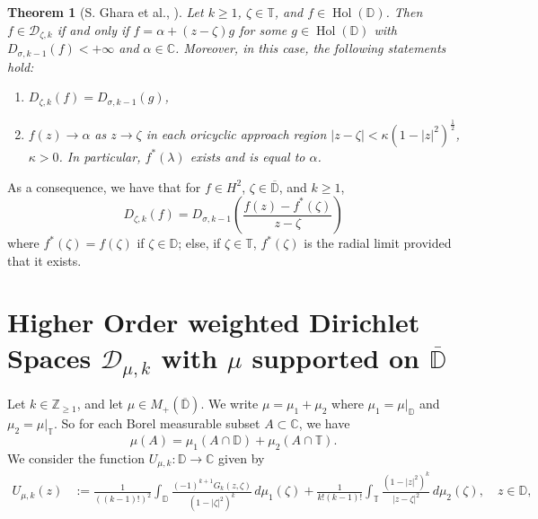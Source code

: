 \documentclass[10pt,oneside,reqno]{amsart}
\newtheorem{theorem}{Theorem}[section]
\theoremstyle{definition}
\theoremstyle{remark}
\newcommand{\abs}[1]{\left\lvert #1 \right\rvert}
\renewcommand{\ge}{\geqslant}
\newcommand{\C}{\mathbb C}
\newcommand{\D}{\mathbb D}
\newcommand{\T}{\mathbb T}
\numberwithin{equation}{section}
\begin{document}
\begin{theorem}[S. Ghara et al., \cite{GGRLDF}]
    Let $k \ge 1$, $\zeta \in \T$, and $f \in \operatorname{Hol} (\D)$. Then $f \in \mathscr D_{\zeta, k}$ if and only if $f = \alpha + (z-\zeta) g$ for some $g \in \operatorname{Hol} (\D)$ with $D_{\sigma, k-1} (f) < + \infty$ and $\alpha \in \C$. Moreover, in this case, the following statements hold:
    \begin{enumerate}[label=(\roman*)]
        \item $D_{\zeta, k} (f) = D_{\sigma, k-1} (g)$,
        \item $f(z) \to \alpha$ as $z \to \zeta$ in each oricyclic approach region $\abs{z-\zeta} < \kappa (1-\abs{z}^2)^{\frac{1}{2}}$, $\kappa > 0$. In particular, $f^{*} (\lambda)$ exists and is equal to $\alpha$.
    \end{enumerate}
\end{theorem}
As a consequence, we have that for $f \in H^2$, $\zeta \in \overline{\D}$, and $k \ge 1$,  
\begin{equation}  
    D_{\zeta, k} (f) = D_{\sigma, k-1} \left( \frac{f(z) - f^{*} (\zeta)}{z-\zeta} \right)
    \label{eqn:local-douglas-formula}
\end{equation}  
where $f^{*} (\zeta) = f(\zeta)$ if $\zeta \in \D$; else, if $\zeta \in \T$, $f^{*} (\zeta)$ is the radial limit provided that it exists.  

\section{Higher Order weighted Dirichlet Spaces \texorpdfstring{$\mathscr D_{\mu,k}$}{D(mu,k)} with \texorpdfstring{$\mu$}{mu} supported on \texorpdfstring{$\overline{\mathbb D}$}{bar D}}

Let $k \in \mathbb Z _{\ge 1}$, and let $\mu\in M_+(\overline{\D}).$ We write $\mu = \mu_1+\mu_2$ where $\mu_1= \mu|_{\D}$ and $\mu_2= \mu|_{\mathbb T}.$ So for each Borel measurable subset $A \subset \C$, we have 
\begin{equation*}
    \mu (A) = \mu_1 (A \cap \D) + \mu_2 (A \cap \T).
\end{equation*} 
We consider the function $U_{\mu, k} : \mathbb D \to \mathbb C$ given by 
\begin{align*}
    U_{\mu,k}(z) &:= \frac{1}{((k-1)!)^{2}} 
    \int_{\D} \frac{(-1)^{k+1} G_k(z,\zeta)}{(1-|\zeta|^{2})^{k}}\, d\mu_1(\zeta) 
    + \frac{1}{k!(k-1)!} \int_{\T} \frac{(1-|z|^{2})^{k}}{|z-\zeta|^{2}}\, d\mu_2(\zeta),\quad z\in \D,
\end{align*}
\end{document}
